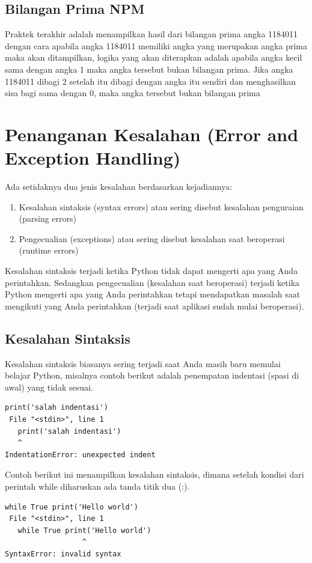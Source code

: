 \subsection{Bilangan Prima NPM}
Praktek terakhir adalah menampilkan hasil dari bilangan prima angka 1184011 dengan cara apabila angka 1184011 memiliki angka yang merupakan angka prima maka akan ditampilkan, logika yang akan diterapkan adalah apabila angka kecil sama dengan angka 1 maka angka tersebut bukan bilangan prima. Jika angka 1184011 dibagi 2 setelah itu dibagi dengan angka itu sendiri dan menghasilkan sisa bagi sama dengan 0, maka angka tersebut bukan bilangan prima


\section{Penanganan Kesalahan (Error and Exception Handling)}
Ada setidaknya dua jenis kesalahan berdasarkan kejadiannya: \\
\begin{enumerate}
\item Kesalahan sintaksis (syntax errors) atau sering disebut kesalahan penguraian (parsing errors)
\item Pengecualian (exceptions) atau sering disebut kesalahan saat beroperasi (runtime errors)
\end{enumerate}
Kesalahan sintaksis terjadi ketika Python tidak dapat mengerti apa yang Anda perintahkan. Sedangkan pengecualian (kesalahan saat beroperasi) terjadi ketika Python mengerti apa yang Anda perintahkan tetapi mendapatkan masalah saat mengikuti yang Anda perintahkan (terjadi saat aplikasi sudah mulai beroperasi).

\subsection{Kesalahan Sintaksis}
Kesalahan sintaksis biasanya sering terjadi saat Anda masih baru memulai belajar Python, misalnya contoh berikut adalah penempatan indentasi (spasi di awal) yang tidak sesuai.
\begin{verbatim}
print('salah indentasi')
 File "<stdin>", line 1
   print('salah indentasi')
   ^
IndentationError: unexpected indent
\end{verbatim}
Contoh berikut ini menampilkan kesalahan sintaksis, dimana setelah kondisi dari perintah while diharuskan ada tanda titik dua (:).\\
\begin{verbatim}
while True print('Hello world')
 File "<stdin>", line 1
   while True print('Hello world')
                  ^
SyntaxError: invalid syntax
\end{verbatim}

